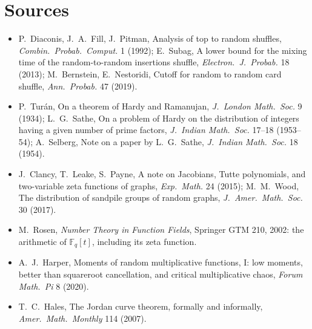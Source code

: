 \section{Sources}

\begin{itemize}
\item P.~Diaconis, J.~A.~Fill, J.~Pitman, Analysis of top to random shuffles, \emph{Combin.\ Probab.\ Comput.} 1 (1992); E.~Subag, A lower bound for the mixing time of the random-to-random insertions shuffle, \emph{Electron.\ J.\ Probab.} 18 (2013); M.~Bernstein, E.~Nestoridi, Cutoff for random to random card shuffle, \emph{Ann.\ Probab.} 47 (2019).
\item P.~Tur\'an, On a theorem of Hardy and Ramanujan, \emph{J.\ London Math.\ Soc.} 9 (1934); L.~G.~Sathe, On a problem of Hardy on the distribution of integers having a given number of prime factors, \emph{J.\ Indian Math.\ Soc.} 17--18 (1953--54); A.~Selberg, Note on a paper by L.~G.~Sathe, \emph{J.\ Indian Math.\ Soc.} 18 (1954).
\item J.~Clancy, T.~Leake, S.~Payne, A note on Jacobians, Tutte polynomials, and two-variable zeta functions of graphs, \emph{Exp.\ Math.} 24 (2015); M.~M.~Wood, The distribution of sandpile groups of random graphs, \emph{J.\ Amer.\ Math.\ Soc.} 30 (2017).
\item M.~Rosen, \emph{Number Theory in Function Fields}, Springer GTM 210, 2002: the arithmetic of $\mathbb F_q[t]$, including its zeta function.
\item A.~J.~Harper, Moments of random multiplicative functions, I: low moments, better than squareroot cancellation, and critical multiplicative chaos, \emph{Forum Math.\ Pi} 8 (2020).
\item T.~C.~Hales, The Jordan curve theorem, formally and informally, \emph{Amer.\ Math.\ Monthly} 114 (2007).
\end{itemize}
